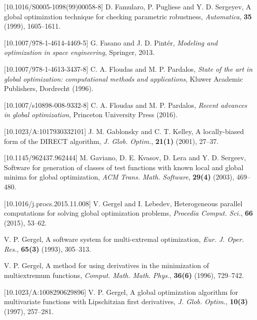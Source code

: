 \documentclass{aims}
\theoremstyle{definition}
\begin{document}
\begin{thebibliography}{10}
[10.1016/S0005-1098(99)00058-8]
\newblock D. Famularo, P. Pugliese and Y. D. Sergeyev,
\newblock A global optimization technique for checking parametric robustness,
\newblock \emph{Automatica}, \textbf{35} (1999), 1605--1611.

[10.1007/978-1-4614-4469-5]
\newblock G. Fasano and J. D. Pint\'er,
\newblock \emph{Modeling and optimization in space engineering},
\newblock Springer, 2013.

[10.1007/978-1-4613-3437-8]
\newblock C. A. Floudas and M. P. Pardalos,
\newblock \emph{State of the art in global optimization: computational methods and applications},
\newblock Kluwer Academic Publishers, Dordrecht (1996).

[10.1007/s10898-008-9332-8]
\newblock C. A. Floudas and M. P. Pardalos,
\newblock \emph{Recent advances in global optimization},
\newblock Princeton University Press (2016).

[10.1023/A:1017930332101]
\newblock J. M. Gablonsky and C. T. Kelley,
\newblock A locally-biased form of the DIRECT algorithm,
\newblock \emph{J. Glob. Optim.}, \textbf{21(1)} (2001), 27--37.

[10.1145/962437.962444]
\newblock M. Gaviano, D. E. Kvasov, D. Lera and Y. D. Sergeev,
\newblock Software for generation of classes of test functions with known local and global minima for global optimization,
\newblock \emph{ACM Trans. Math. Software}, \textbf{29(4)} (2003), 469--480.

[10.1016/j.procs.2015.11.008]
\newblock V. Gergel and I. Lebedev,
\newblock Heterogeneous parallel computations for solving global optimization problems,
\newblock \emph{Procedia Comput. Sci.}, \textbf{66} (2015), 53--62.

\newblock V. P. Gergel,
\newblock A software system for multi-extremal optimization,
\newblock \emph{Eur. J. Oper. Res.}, \textbf{65(3)} (1993), 305--313.

\newblock V. P. Gergel,
\newblock A method for using derivatives in the minimization of multiextremum functions,
\newblock \emph{Comput. Math. Math. Phys.}, \textbf{36(6)} (1996), 729--742.

[10.1023/A:1008290629896]
\newblock V. P. Gergel,
\newblock A global optimization algorithm for multivariate functions with Lipschitzian first derivatives,
\newblock \emph{J. Glob. Optim.}, \textbf{10(3)} (1997), 257--281.


\end{thebibliography}
\end{document}
